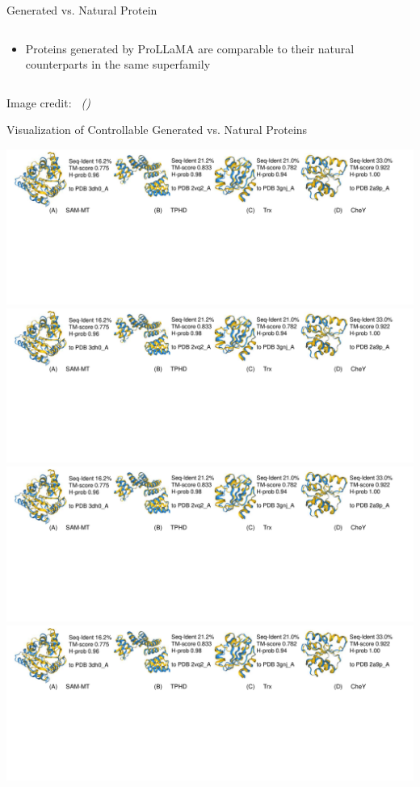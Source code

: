 \documentclass[dvipsnames,
hyperref={
	citecolor=blue,
	colorlinks=true,
	urlcolor=blue,
	linkcolor=,
}
]{beamer}
\newcommand{\credit}[2]{{\par\hfill \tiny #1 credit:~\itshape{\color{blue} \citeauthor{#2} (\citeyear{#2})}}}
\begin{document}
\begin{frame}{Generated vs. Natural Protein}
\begin{columns}
\begin{column}{0.5\textwidth}
			\begin{itemize}
				\item Proteins generated by ProLLaMA are comparable to their
				natural counterparts in the same superfamily
			\end{itemize}
		\end{column}
	\end{columns}
	\credit{Image}{lv2024prollama}
\end{frame}

\begin{frame}{Visualization of Controllable Generated vs. Natural Proteins}
	\begin{center}
		\includegraphics[trim={0 0 90em 0},clip,scale=0.4]{images/protein_visualization.pdf}
		\includegraphics[trim={31.5em 0 57.4em 0},clip,scale=0.4]{images/protein_visualization.pdf}
		\includegraphics[trim={64em 0 30em 0},clip,scale=0.4]{images/protein_visualization.pdf}
		\includegraphics[trim={92em 0 0 0},clip,scale=0.4]{images/protein_visualization.pdf}

\end{center}
\end{frame}
\end{document}
